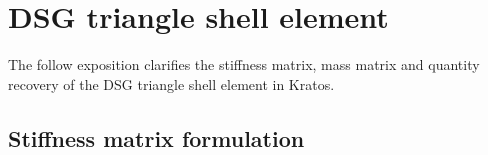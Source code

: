 





\setcounter{MaxMatrixCols}{20}




\chapter{DSG triangle shell element}
\label{chap:chapter_3}

\renewcommand{\Thema}{DSG triangle shell element}

The follow exposition clarifies the stiffness matrix, mass matrix and quantity recovery of the DSG triangle shell element in Kratos. 

\section{Stiffness matrix formulation}

